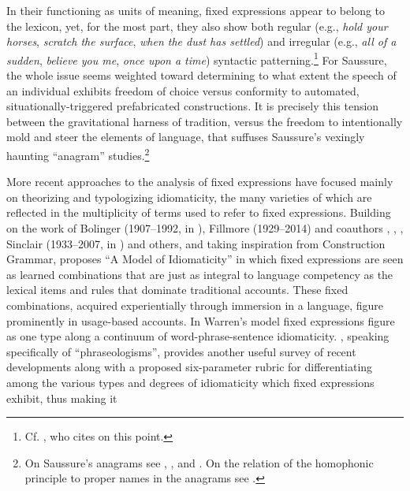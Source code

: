 \documentclass[output=paper]{langsci/langscibook}
\begin{document}
In their functioning as units of meaning, fixed expressions appear to belong to the lexicon, yet, for the most part, they also show both regular (e.g., \textit{hold your horses}, \textit{scratch the surface}, \textit{when the dust has settled}) and irregular (e.g., \textit{all of a sudden}, \textit{believe you me}, \textit{once upon a time}) syntactic patterning.\footnote{Cf. \citet[2--3]{wood_formulaic_2002}, who cites \citet[36]{richards_two_1983} on this point.} For Saussure, the whole issue seems weighted toward determining to what extent the speech of an individual exhibits freedom of choice versus conformity to automated, situationally-triggered prefabricated constructions. It is precisely this tension between the gravitational harness of tradition, versus the freedom to intentionally mold and steer the elements of language, that suffuses Saussure’s vexingly haunting ``anagram'' studies.\footnote{On Saussure’s anagrams see \citealt{guimaraes_presence_2007}, \citeyear{christy_saussures_1999}, and \citeyear{carr_c_1999}. On the relation of the homophonic principle to proper names in the anagrams see \citealt{christy_concept_1995}.}

More recent approaches to the analysis of fixed expressions have focused mainly on theorizing and typologizing idiomaticity, the many varieties of which are reflected in the multiplicity of terms used to refer to fixed expressions. Building on the work of Bolinger (1907--1992, in \citeyear{bolinger_meaning_1976}), Fillmore (1929--2014) and coauthors \citeyear{fillmore_regularity_1988}, \citet{makkai_idiom_1972}, \citet{richards_two_1983}, Sinclair (1933--2007, in \citeyear{sinclair_corpus_1991}) and others, and taking inspiration from Construction Grammar, \citet{warren_model_2005} proposes “A Model of Idiomaticity” in which fixed expressions are seen as learned combinations that are just as integral to language competency as the lexical items and rules that dominate traditional accounts. These fixed combinations, acquired experientially through immersion in a language, figure prominently in usage-based accounts. In Warren’s model fixed expressions figure as one type along a continuum of word-phrase-sentence idiomaticity. \citet{granger_phraseology_2008}, speaking specifically of ``phraseologisms'', provides another useful survey of recent developments along with a proposed six-parameter rubric for differentiating among the various types and degrees of idiomaticity which fixed expressions exhibit, thus making it 
\end{document}
